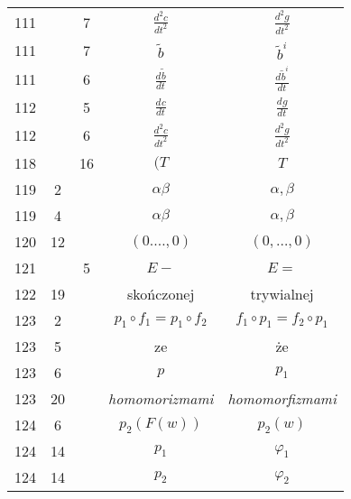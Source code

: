 \documentclass[a4paper,11pt]{article}
\newcommand{\ld}{\ldots}
\newcommand{\al}{\alpha}
\newcommand{\be}{\beta}
\newcommand{\vp}{\varphi}
\newcommand{\wt}{\widetilde}
\newcommand{\dd}[3]{\frac{ d^{ #1 } { #2 } }{ d { #3 }^{ #1 } }}
\begin{document}
\begin{center}
\begin{tabular}{|c|c|c|c|c|}
    111 & &  7 & $\dd{ 2 }{ c }{ t }$ & $\dd{ 2 }{ g }{ t }$ \\
    111 & &  7 & $\wt{ b }$ & $\wt{ b }^{ i }$ \\
    111 & &  6 & $\dd{}{ \wt{ b } }{ t }$
           & $\dd{}{ \wt{ b }^{ i } }{ t }$ \\
    112 & &  5 & $\dd{}{ c }{ t }$ & $\dd{}{ g }{ t }$ \\
    112 & &  6 & $\dd{ 2 }{ c }{ t }$ & $\dd{ 2 }{ g }{ t }$ \\
    118 & & 16 & $(T$ & $T$ \\
    119 &  2 & & $\al\be$ & $\al, \be$ \\
    119 &  4 & & $\al\be$ & $\al, \be$ \\
    120 & 12 & & $( 0. \ld, 0 )$ & $( 0, \ld, 0 )$ \\
    121 & &  5 & $E -$ & $E =$ \\
    122 & 19 & & skończonej & trywialnej \\
    123 &  2 & & $p_{ 1 } \circ f_{ 1 } = p_{ 1 } \circ f_{ 2 }$
           & $f_{ 1 } \circ p_{ 1 } = f_{ 2 } \circ p_{ 1 }$ \\
    123 &  5 & & ze & że \\
    123 &  6 & & $p$ & $p_{ 1 }$ \\
    123 & 20 & & \emph{homomorizmami} & \emph{homomorfizmami} \\
    124 &  6 & & $p_{ 2 }( F( w ) )$ & $p_{ 2 }( w )$ \\
    124 & 14 & & $p_{ 1 }$ & $\vp_{ 1 }$ \\
    124 & 14 & & $p_{ 2 }$ & $\vp_{ 2 }$ \\
    \hline
  \end{tabular}



\end{center}
\end{document}
